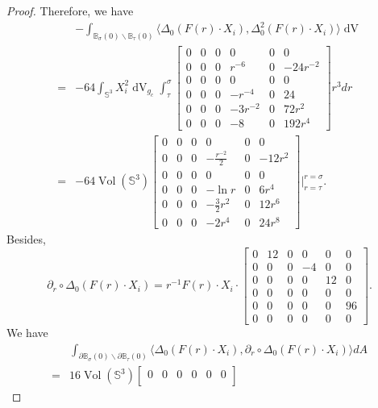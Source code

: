 \documentclass[11pt,letterpaper]{amsart}
\DeclareMathOperator{\Vol}{Vol}
\DeclareMathOperator{\dvol}{dV}
\newcommand{\bB}{\mathbb{B}}
\newcommand{\bS}{\mathbb{S}}
\theoremstyle{definition}
\theoremstyle{remark}
\numberwithin{equation}{section}
\begin{document}
\begin{proof}
Therefore, we have
\begin{equation}
\begin{split}
    &-\int_{\bB_{\sigma}(0)\backslash \bB_{\tau}(0)}\langle \Delta_0 (F(r)\cdot X_i), \Delta^2_0(F(r)\cdot X_i)\rangle \dvol\\
=&-64\int_{\bS^3} X^2_i\dvol_{g_c}\int_{\tau}^{\sigma}\begin{bmatrix}
0 & 0 & 0 & 0 & 0& 0\\
0 & 0 & 0 & r^{-6} & 0& -24r^{-2}\\
0 & 0 & 0 & 0 & 0& 0\\
0 & 0 & 0 & -r^{-4} & 0& 24\\
0 & 0 & 0 & -3r^{-2} & 0& 72r^2\\
0 & 0 & 0 & -8 & 0 & 192r^4
\end{bmatrix}r^3dr\\
=&-64\Vol(\bS^3) \begin{bmatrix}
0 & 0 & 0 & 0 & 0& 0\\
0 & 0 & 0 & -\frac{r^{-2}}{2} & 0& -12r^2\\
0 & 0 & 0 & 0 & 0& 0\\
0 & 0 & 0 & -\ln r & 0& 6r^4\\
0 & 0 & 0 & -\frac{3}{2}r^2 & 0& 12r^6\\
0 & 0 & 0 & -2r^4 & 0 & 24r^8
\end{bmatrix}\Bigg|_{r=\tau}^{r=\sigma}.
    \end{split}
\end{equation}
Besides,
\begin{equation}
    \partial_r \circ \Delta_0(F(r)\cdot X_i)=r^{-1} F(r)\cdot X_i\cdot 
    \begin{bmatrix}
0 & 12 & 0 & 0 & 0& 0\\
0 & 0 & 0 & -4 & 0& 0\\
0 & 0 & 0 & 0 & 12& 0\\
0 & 0 & 0 & 0 & 0& 0\\
0 & 0 & 0 & 0 & 0& 96\\
0 & 0 & 0 & 0 & 0& 0
\end{bmatrix}.
\end{equation}
We have
\begin{equation}
\begin{split}
    &\int_{\partial \bB_{\sigma}(0)\backslash \partial \bB_{\tau}(0)} \langle \Delta_0(F(r)\cdot X_i), \partial_r \circ \Delta_0(F(r)\cdot X_i) \rangle dA\\
    =&16 \Vol(\bS^3) \begin{bmatrix}
0 & 0 & 0 & 0 & 0& 0\\

\end{bmatrix}
\end{split}
\end{equation}
\end{proof}
\end{document}
